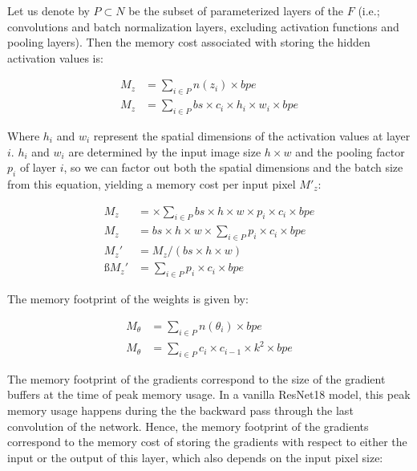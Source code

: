 \documentclass[twocolumn]{bmcart}
\begin{document}
Let us denote by $P \subset N$ be the subset of parameterized layers of the $F$ (i.e.; convolutions and batch normalization layers, excluding activation functions and pooling layers). Then the memory cost associated with storing the hidden activation values is: 

\begin{subequations}
\begin{align}
M_{z} &= \sum_{i \in P} n(z_i) \times bpe \\
M_{z} &= \sum_{i \in P} bs \times c_i \times h_i \times w_i \times bpe 
\end{align}
\end{subequations}

Where $h_i$ and $w_i$ represent the spatial dimensions of the activation values at layer $i$.
$h_i$ and $w_i$ are determined by the input image size $h \times w$ and the pooling factor $p_i$ of layer $i$, so we can factor out both the spatial dimensions and the batch size from this equation, yielding a memory cost per input pixel $M'_z$:

\begin{subequations}
\begin{align}
M_{z} &= \times \sum_{i \in P} bs \times h \times w \times p_i \times c_i \times bpe \\
M_{z} &= bs \times h \times w \times \sum_{i \in P} p_i \times c_i \times bpe \\
M_{z}' &= M_{z} / (bs \times h \times w)  \\ß
M_{z}' &= \sum_{i \in P} p_i \times c_i \times bpe 
\end{align}
\end{subequations}

The memory footprint of the weights is given by:

\begin{subequations}
\begin{align}
 M_{\theta} &= \sum_{i \in P}  n(\theta_i)\times bpe \\
 M_{\theta} &= \sum_{i \in P} c_i \times c_{i-1} \times k^2 \times bpe
\end{align}
\end{subequations}

The memory footprint of the gradients correspond to the size of the gradient buffers at the time of peak memory usage. In a vanilla ResNet18 model, this peak memory usage happens during the the backward pass through the last convolution of the network.
Hence, the memory footprint of the gradients correspond to the memory cost of storing the gradients with respect to either the input or the output of this layer, which also depends on the input pixel size:
\end{document}
